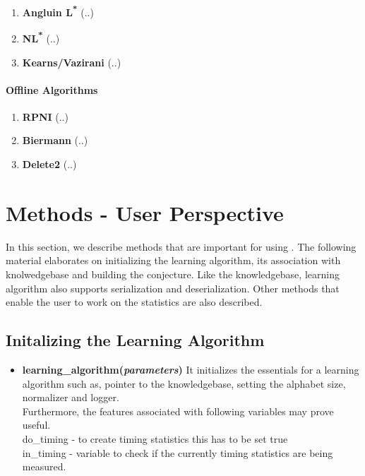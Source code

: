 \begin{enumerate}
 \item \textbf{Angluin L\textsuperscript{*}} \cite{36889-angluin1} \cite{181015-angluin2} \cite{640230-angluin3}
	(..)
 \item \textbf{NL\textsuperscript{*}} \cite{DBLP:conf/ijcai/BolligHKL09-nl1} \cite{DBLP:conf/wia/GarciaRCA05-nl2}
	(..)
 \item \textbf{Kearns/Vazirani} \cite{DBLP:conf/nips/CrammerKW06-Kearns1} \cite{DBLP:conf/nips/LittmanKS01-kearns2} \cite{200548-kearns3}
	(..)
\end{enumerate}

\paragraph{Offline Algorithms}

\begin{enumerate}
 \item \textbf{RPNI} \cite{DBLP:conf/aia/Hoffmann07-rpni1} \cite{599647-rpni2} \cite{655948-rpni3} \cite{1434324-rpni4}
	(..)
 \item \textbf{Biermann} \cite{17952-biermann1}
	(..)
 \item \textbf{Delete2} \cite{982366-delete1}
	(..)
\end{enumerate}

\section{Methods - User Perspective}

In this section, we describe methods that are important for using \libalf. The following material elaborates on initializing the learning algorithm, its association with knolwedgebase and building the conjecture. Like the knowledgebase, learning algorithm also supports serialization and deserialization. Other methods that enable the user to work on the statistics are also described.

\subsection*{Initalizing the Learning Algorithm}

\begin{itemize}
 \item \textbf{learning\_algorithm(\emph{parameters})} \vskip 1pt
	It initializes the essentials for a learning algorithm such as, pointer to the knowledgebase, setting the alphabet size, normalizer and logger. \\ Furthermore, the features associated with following variables may prove useful. \\
	do\_timing - to create timing statistics this has to be set true \\
	in\_timing - variable to check if the currently timing statistics are being measured. \\
\end{itemize}

